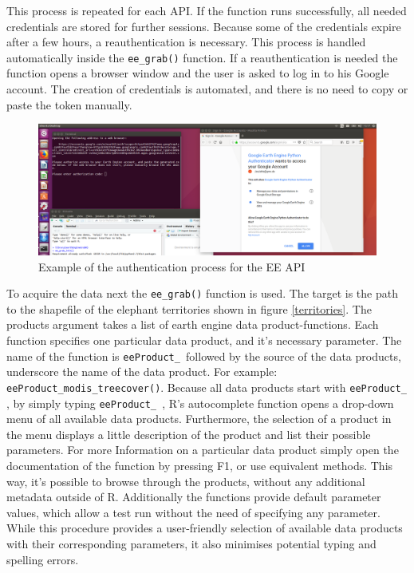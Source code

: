 This process is repeated for each API. If the function runs successfully, all needed credentials are stored for further sessions. Because some of the credentials expire after a few hours, a reauthentication is necessary. This process is handled automatically inside the \texttt{ee\_grab()} function. If a reauthentication is needed the function opens a browser window and the user is asked to log in to his Google account. The creation of credentials is automated, and there is no need to copy or paste the token manually.

\begin{center}
	\begin{figure}[h]
		\begin{center}
			\includegraphics[width=15cm]{images/install_authentication.png}
			\caption{Example of the authentication process for the EE API}
			\label{install}
		\end{center}
	\end{figure}
\end{center}



To acquire the data next the \texttt{ee\_grab()} function is used. The target is the path to the shapefile of the elephant territories shown in figure \ref{territories}. The products argument takes a list of earth engine data product-functions. Each function specifies one particular data product, and it's necessary parameter. The name of the function is \texttt{eeProduct\_ }followed by the source of the data products, underscore the name of the data product. For example: \texttt{eeProduct\_modis\_treecover()}. Because all data products start with \texttt{eeProduct\_ }, by simply typing \texttt{eeProduct\_ }, R's autocomplete function opens a drop-down menu of all available data products. Furthermore, the selection of a product in the menu displays a little description of the product and list their possible parameters. For more Information on a particular data product simply open the documentation of the function by pressing F1, or use equivalent methods. This way, it's possible to browse through the products, without any additional metadata outside of R. Additionally the functions provide default parameter values, which allow a test run without the need of specifying any parameter. While this procedure provides a user-friendly selection of available data products with their corresponding parameters, it also minimises potential typing and spelling errors.

